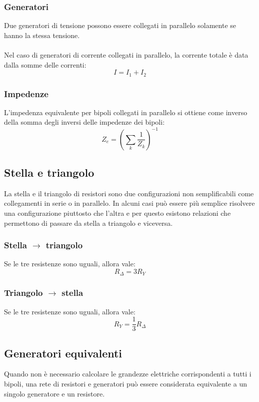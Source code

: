 \documentclass{article}
\begin{document}
\subsubsection{Generatori}
Due generatori di tensione possono essere collegati in parallelo solamente se hanno la stessa tensione.\\\\
Nel caso di generatori di corrente collegati in parallelo, la corrente totale è data dalla somme delle correnti:
$$ I=I_1+I_2 $$

\subsubsection{Impedenze}
L'impedenza equivalente per bipoli collegati in parallelo si ottiene come inverso della somma degli inversi delle impedenze dei bipoli:
$$ Z_e = \left( \sum_k \frac{1}{Z_k} \right)^{-1} $$

\subsection{Stella e triangolo}
La stella e il triangolo di resistori sono due configurazioni non semplificabili come collegamenti in serie o in parallelo. In alcuni casi può essere più semplice risolvere una configurazione piuttosto che l'altra e per questo esistono relazioni che permettono di passare da stella a triangolo e viceversa.

\subsubsection{Stella $\rightarrow$ triangolo}
Se le tre resistenze sono uguali, allora vale:
$$ R_\Delta=3R_Y $$

\subsubsection{Triangolo $\rightarrow$ stella}
Se le tre resistenze sono uguali, allora vale:
$$ R_Y=\frac{1}{3}R_\Delta $$

\subsection{Generatori equivalenti}
Quando non è necessario calcolare le grandezze elettriche corrispondenti a tutti i bipoli, una rete di resistori e generatori può essere considerata equivalente a un singolo generatore e un resistore.
\end{document}

